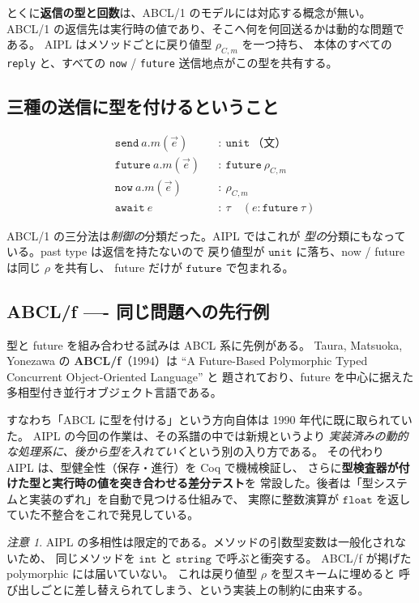 \documentclass[11pt,a4paper]{ltjsarticle}
\theoremstyle{remark}
\newtheorem{remark}{注意}
\newcommand{\ty}[1]{\ensuremath{\mathtt{#1}}}
\begin{document}
とくに\textbf{返信の型と回数}は、ABCL/1 のモデルには対応する概念が無い。
ABCL/1 の返信先は実行時の値であり、そこへ何を何回送るかは動的な問題である。
AIPL はメソッドごとに戻り値型 $\rho_{C,m}$ を一つ持ち、
本体のすべての \texttt{reply} と、すべての \texttt{now} / \texttt{future}
送信地点がこの型を共有する。

\subsection{三種の送信に型を付けるということ}

\begin{align*}
&\texttt{send}\ a.m(\vec{e})    &&: \ \ty{unit}\ \text{（文）} \\
&\texttt{future}\ a.m(\vec{e})  &&: \ \ty{future}\ \rho_{C,m} \\
&\texttt{now}\ a.m(\vec{e})     &&: \ \rho_{C,m} \\
&\texttt{await}\ e              &&: \ \tau \quad (e : \ty{future}\ \tau)
\end{align*}

ABCL/1 の三分法は\emph{制御の}分類だった。AIPL ではこれが
\emph{型の}分類にもなっている。past type は返信を持たないので
戻り値型が \ty{unit} に落ち、now / future は同じ $\rho$ を共有し、
future だけが \ty{future} で包まれる。

\subsection{ABCL/f ---- 同じ問題への先行例}

型と future を組み合わせる試みは ABCL 系に先例がある。
Taura, Matsuoka, Yonezawa の \textbf{ABCL/f}（1994）は
``A Future-Based Polymorphic Typed Concurrent Object-Oriented Language'' と
題されており、future を中心に据えた多相型付き並行オブジェクト言語である。

すなわち「ABCL に型を付ける」という方向自体は 1990 年代に既に取られていた。
AIPL の今回の作業は、その系譜の中では新規というより
\emph{実装済みの動的な処理系に、後から型を入れていく}という別の入り方である。
その代わり AIPL は、型健全性（保存・進行）を Coq で機械検証し、
さらに\textbf{型検査器が付けた型と実行時の値を突き合わせる差分テスト}を
常設した。後者は「型システムと実装のずれ」を自動で見つける仕組みで、
実際に整数演算が \ty{float} を返していた不整合をこれで発見している。

\begin{remark}
AIPL の多相性は限定的である。メソッドの引数型変数は一般化されないため、
同じメソッドを \ty{int} と \ty{string} で呼ぶと衝突する。
ABCL/f が掲げた polymorphic には届いていない。
これは戻り値型 $\rho$ を型スキームに埋めると
呼び出しごとに差し替えられてしまう、という実装上の制約に由来する。
\end{remark}
\end{document}
